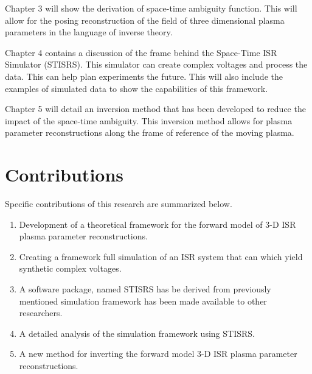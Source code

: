 Chapter 3 will show the derivation of space-time ambiguity function. This will allow for the posing reconstruction of the field of three dimensional plasma parameters in the language of inverse theory. 

Chapter 4 contains a discussion of the frame behind the Space-Time ISR Simulator (STISRS). This simulator can create complex voltages and process the data. This can help plan experiments the future. This will also include the examples of simulated data to show the capabilities of this framework.

Chapter 5 will detail an inversion method that has been developed to reduce the impact of the space-time ambiguity. This inversion method allows for plasma parameter reconstructions along the frame of reference of the moving plasma.

\section{Contributions}
Specific contributions of this research are summarized below.

\begin{enumerate}
\item Development of a theoretical framework for the forward model of 3-D ISR plasma parameter reconstructions.
\item Creating a framework full simulation of an ISR system that can which yield synthetic complex voltages.
\item A software package, named STISRS has be derived from previously mentioned simulation framework has been made available to other researchers.
\item A detailed analysis of the simulation framework using STISRS.
\item A new method for inverting the forward model 3-D ISR plasma parameter reconstructions.
\end{enumerate}